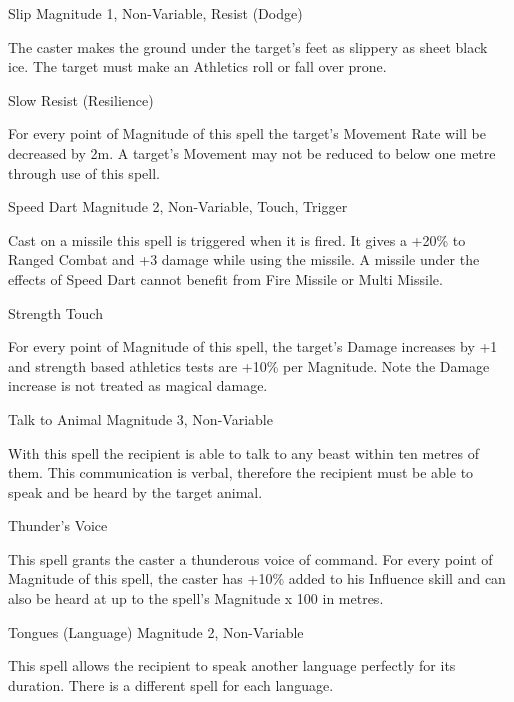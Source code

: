 \begin{rpg-spell}
{Slip}
{Magnitude 1, Non-Variable, Resist (Dodge)}

The caster makes the ground under the target’s feet as slippery as sheet black ice. The target must make an Athletics roll or fall over prone.
\end{rpg-spell}


\begin{rpg-spell}
{Slow}
{Resist (Resilience)}

For every point of Magnitude of this spell the target’s Movement Rate will be decreased by 2m. A target’s Movement may not be reduced to below one metre through use of this spell. 
\end{rpg-spell}


\begin{rpg-spell}
{Speed Dart}
{Magnitude 2, Non-Variable, Touch, Trigger}

Cast on a missile this spell is triggered when it is fired. It gives a +20\% to Ranged Combat and +3 damage while using the missile. A missile under the effects of Speed Dart cannot benefit from Fire Missile or Multi Missile.
\end{rpg-spell}


\begin{rpg-spell}
{Strength}
{Touch}

For every point of Magnitude of this spell, the target’s Damage increases by +1 and strength based athletics tests are +10\% per Magnitude. Note the Damage increase is not treated as magical damage.
\end{rpg-spell}


\begin{rpg-spell}
{Talk to Animal}
{Magnitude 3, Non-Variable}

With this spell the recipient is able to talk to any beast within ten metres of them. This communication is verbal, therefore the recipient must be able to speak and be heard by the target animal. 
\end{rpg-spell}


\begin{rpg-spell}
{Thunder's Voice}
{}

This spell grants the caster a thunderous voice of command. For every point of Magnitude of this spell, the caster has +10\% added to his Influence skill and can also be heard at up to the spell’s Magnitude x 100 in metres.
\end{rpg-spell}


\begin{rpg-spell}
{Tongues (Language)}
{Magnitude 2, Non-Variable}

This spell allows the recipient to speak another language perfectly for its duration. There is a different spell for each language.
\end{rpg-spell}


